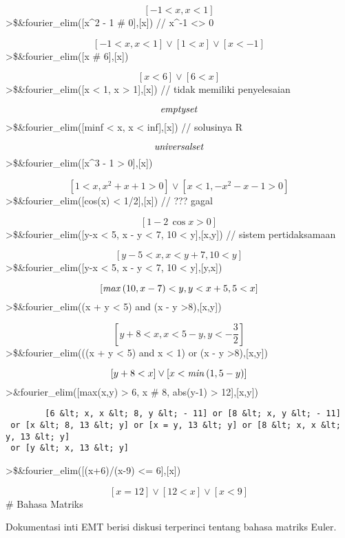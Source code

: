 \documentclass[
]{book}
\begin{document}
\[\left[ -1<x , x<1 \right]\]\textgreater\$\&fourier\_elim({[}x\^{}2 - 1 \# 0{]},{[}x{]}) // x\^{}-1 \textless\textgreater{} 0

\[\left[ -1<x , x<1 \right] \lor \left[ 1<x \right] \lor \left[ x<-1\right]\]\textgreater\$\&fourier\_elim({[}x \# 6{]},{[}x{]})

\[\left[ x<6 \right] \lor \left[ 6<x \right]\]\textgreater\$\&fourier\_elim({[}x \textless{} 1, x \textgreater{} 1{]},{[}x{]}) // tidak memiliki penyelesaian

\[{\it emptyset}\]\textgreater\$\&fourier\_elim({[}minf \textless{} x, x \textless{} inf{]},{[}x{]}) // solusinya R

\[{\it universalset}\]\textgreater\$\&fourier\_elim({[}x\^{}3 - 1 \textgreater{} 0{]},{[}x{]})

\[\left[ 1<x , x^2+x+1>0 \right] \lor \left[ x<1 , -x^2-x-1>0\right]\]\textgreater\$\&fourier\_elim({[}cos(x) \textless{} 1/2{]},{[}x{]}) // ??? gagal

\[\left[ 1-2\,\cos x>0 \right]\]\textgreater\$\&fourier\_elim({[}y-x \textless{} 5, x - y \textless{} 7, 10 \textless{} y{]},{[}x,y{]}) // sistem pertidaksamaan

\[\left[ y-5<x , x<y+7 , 10<y \right]\]\textgreater\$\&fourier\_elim({[}y-x \textless{} 5, x - y \textless{} 7, 10 \textless{} y{]},{[}y,x{]})

\[\left[ {\it max}\left(10 , x-7\right)<y , y<x+5 , 5<x \right]\]\textgreater\$\&fourier\_elim((x + y \textless{} 5) and (x - y \textgreater8),{[}x,y{]})

\[\left[ y+8<x , x<5-y , y<-\frac{3}{2} \right]\]\textgreater\$\&fourier\_elim(((x + y \textless{} 5) and x \textless{} 1) or (x - y \textgreater8),{[}x,y{]})

\[\left[ y+8<x \right] \lor \left[ x<{\it min}\left(1 , 5-y\right)\right]\]\textgreater\&fourier\_elim({[}max(x,y) \textgreater{} 6, x \# 8, abs(y-1) \textgreater{} 12{]},{[}x,y{]})

\begin{verbatim}
        [6 &lt; x, x &lt; 8, y &lt; - 11] or [8 &lt; x, y &lt; - 11]
 or [x &lt; 8, 13 &lt; y] or [x = y, 13 &lt; y] or [8 &lt; x, x &lt; y, 13 &lt; y]
 or [y &lt; x, 13 &lt; y]
\end{verbatim}

\textgreater\$\&fourier\_elim({[}(x+6)/(x-9) \textless= 6{]},{[}x{]})

\[\left[ x=12 \right] \lor \left[ 12<x \right] \lor \left[ x<9\right]\]\# Bahasa Matriks

Dokumentasi inti EMT berisi diskusi terperinci tentang bahasa matriks Euler.
\end{document}
